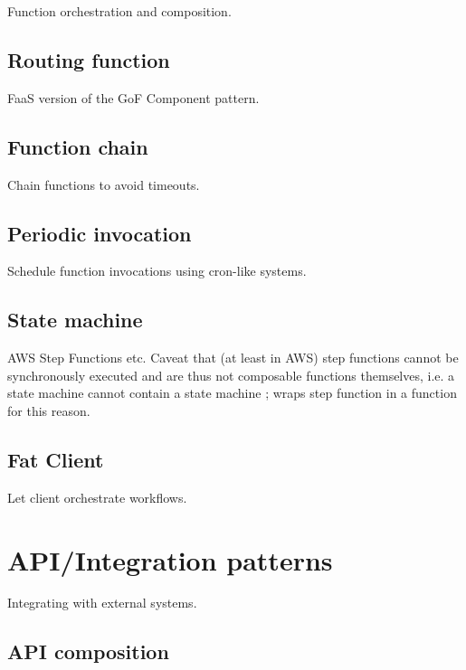 Function orchestration and composition.

\subsection{Routing function} \label{subsubsec:routingFunction}

FaaS version of the GoF Component pattern.

\subsection{Function chain} \label{subsubsec:functionChain}

Chain functions to avoid timeouts.

\subsection{Periodic invocation} \label{subsubsec:periodicInvocation}

Schedule function invocations using cron-like systems.

\subsection{State machine} \label{subsubsec:stateMachine}

AWS Step Functions etc. Caveat that (at least in AWS) step functions cannot be synchronously executed and are thus not composable functions themselves, i.e. a state machine cannot contain a state machine \parencite{lopez18orchestration}; \textcite{daly18blogPatterns} wraps step function in a function for this reason.

\subsection{Fat Client} \label{subsubsec:fatClient}

Let client orchestrate workflows.


\section{API/Integration patterns} \label{sec:apiPatterns}

Integrating with external systems.

\subsection{API composition} \label{subsubsec:apiComposition}

